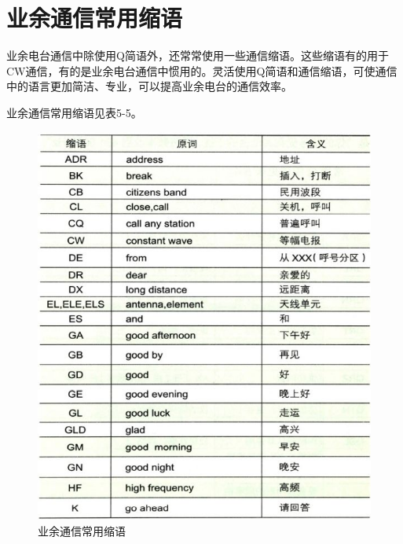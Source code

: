 \documentclass[12pt,UTF8]{ctexbook}
\begin{document}
\section{业余通信常用缩语}

业余电台通信中除使用Q简语外，还常常使用一些通信缩语。这些缩语有的用于CW通信，有的是业余电台通信中惯用的。灵活使用Q简语和通信缩语，可使通信中的语言更加简洁、专业，可以提高业余电台的通信效率。

业余通信常用缩语见表5-5。

\begin{figure}[htbp]
	\centering
	\includegraphics[width=0.7\linewidth]{65}
	\caption{业余通信常用缩语}
	\label{fig:1}
\end{figure}
\end{document}
